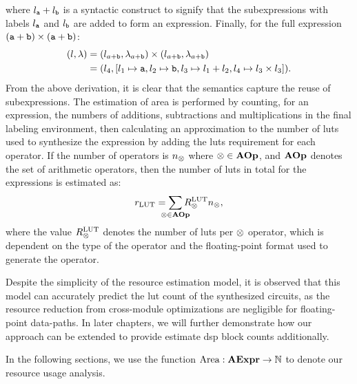 where $l_{\texttt{a}} + l_{\texttt{b}}$ is a syntactic construct to signify that the
subexpressions with labels $l_{\texttt{a}}$ and $l_{\texttt{b}}$ are added to form an
expression.
Finally, for the full expression $(\texttt{a} + \texttt{b}) \times (\texttt{a} + \texttt{b})$:
\begin{equation}
    \begin{aligned}
        (l, \lambda)
            &= (l_{a + \texttt{b}}, \lambda_{a + \texttt{b}}) \times
               (l_{a + \texttt{b}}, \lambda_{a + \texttt{b}}) \\
            &= (l_4, [l_1\mapsto{\texttt{a}}, l_2\mapsto{\texttt{b}},
                      l_3\mapsto{l_1 + l_2}, l_4\mapsto{l_3 \times l_3}]).
    \end{aligned}
\end{equation}
From the above derivation, it is clear that the semantics capture the reuse
of subexpressions. The estimation of area is performed by counting, for an
expression, the numbers of additions, subtractions and multiplications in the
final labeling environment, then calculating an approximation to the number
of \glspl{lut} used to synthesize the expression by adding the \glspl{lut}
requirement for each operator. If the number of operators is $n_\otimes$
where $\otimes \in \mathbf{AOp}$, and $\mathbf{AOp}$ denotes the set of arithmetic
operators, then the number of \glspl{lut} in total for the expressions is
estimated as:
\begin{equation}
    r_\mathrm{LUT} = \sum_{\mathclap{\opsymbol\in\aopset}}
        R^\mathrm{LUT}_\opsymbol n_\opsymbol,
\end{equation}
where the value $R^\mathrm{LUT}_\otimes$ denotes the number of \glspl{lut}
per $\otimes$ operator, which is dependent on the type of the operator and
the floating-point format used to generate the operator.

Despite the simplicity of the resource estimation model, it is observed that
this model can accurately predict the \gls{lut} count of the synthesized
circuits, as the resource reduction from cross-module optimizations are
negligible for floating-point data-paths.  In later chapters, we will further
demonstrate how our approach can be extended to provide estimate \gls{dsp}
block counts additionally.

In the following sections, we use the function $\operatorname{\mathrm{Area}}: \mathbf{AExpr}\to\mathbb{N}$
to denote our resource usage analysis.
